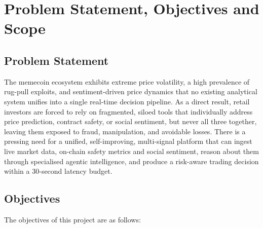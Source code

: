\documentclass[12pt,a4paper,oneside,openany]{book}
\begin{document}
\chapter{Problem Statement, Objectives and Scope}
\label{ch:prob}

\section{Problem Statement}
The memecoin ecosystem exhibits extreme price volatility, a high prevalence of rug-pull exploits, and sentiment-driven price dynamics that no existing analytical system unifies into a single real-time decision pipeline. As a direct result, retail investors are forced to rely on fragmented, siloed tools that individually address price prediction, contract safety, or social sentiment, but never all three together, leaving them exposed to fraud, manipulation, and avoidable losses. There is a pressing need for a unified, self-improving, multi-signal platform that can ingest live market data, on-chain safety metrics and social sentiment, reason about them through specialised agentic intelligence, and produce a risk-aware trading decision within a 30-second latency budget.

\section{Objectives}
The objectives of this project are as follows:
\end{document}
